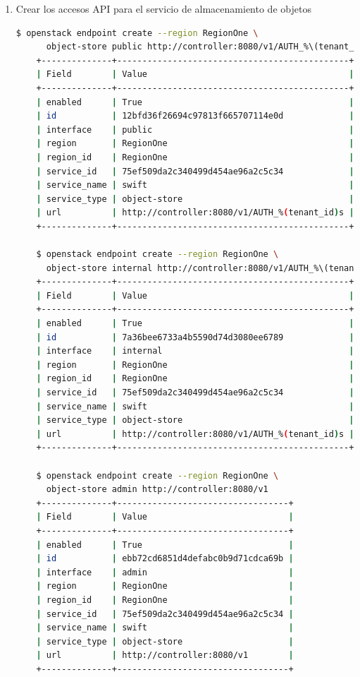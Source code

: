 \documentclass{article}
\begin{document}
\begin{enumerate}
  \item Crear los accesos API para el servicio de almacenamiento de objetos
  \begin{lstlisting}[language=bash]
    $ openstack endpoint create --region RegionOne \
      object-store public http://controller:8080/v1/AUTH_%\(tenant_id\)s
    +--------------+----------------------------------------------+
    | Field        | Value                                        |
    +--------------+----------------------------------------------+
    | enabled      | True                                         |
    | id           | 12bfd36f26694c97813f665707114e0d             |
    | interface    | public                                       |
    | region       | RegionOne                                    |
    | region_id    | RegionOne                                    |
    | service_id   | 75ef509da2c340499d454ae96a2c5c34             |
    | service_name | swift                                        |
    | service_type | object-store                                 |
    | url          | http://controller:8080/v1/AUTH_%(tenant_id)s |
    +--------------+----------------------------------------------+
    
    $ openstack endpoint create --region RegionOne \
      object-store internal http://controller:8080/v1/AUTH_%\(tenant_id\)s
    +--------------+----------------------------------------------+
    | Field        | Value                                        |
    +--------------+----------------------------------------------+
    | enabled      | True                                         |
    | id           | 7a36bee6733a4b5590d74d3080ee6789             |
    | interface    | internal                                     |
    | region       | RegionOne                                    |
    | region_id    | RegionOne                                    |
    | service_id   | 75ef509da2c340499d454ae96a2c5c34             |
    | service_name | swift                                        |
    | service_type | object-store                                 |
    | url          | http://controller:8080/v1/AUTH_%(tenant_id)s |
    +--------------+----------------------------------------------+
    
    $ openstack endpoint create --region RegionOne \
      object-store admin http://controller:8080/v1
    +--------------+----------------------------------+
    | Field        | Value                            |
    +--------------+----------------------------------+
    | enabled      | True                             |
    | id           | ebb72cd6851d4defabc0b9d71cdca69b |
    | interface    | admin                            |
    | region       | RegionOne                        |
    | region_id    | RegionOne                        |
    | service_id   | 75ef509da2c340499d454ae96a2c5c34 |
    | service_name | swift                            |
    | service_type | object-store                     |
    | url          | http://controller:8080/v1        |
    +--------------+----------------------------------+
  \end{lstlisting}
\end{enumerate}
\end{document}
